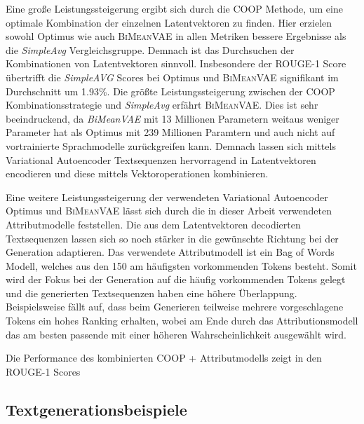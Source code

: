 Eine große Leistungssteigerung ergibt sich durch die COOP Methode, um eine optimale Kombination der einzelnen Latentvektoren zu finden.
Hier erzielen sowohl Optimus wie auch \textsc{BiMeanVAE} in allen Metriken bessere Ergebnisse als die \textit{SimpleAvg} Vergleichsgruppe.
Demnach ist das Durchsuchen der Kombinationen von Latentvektoren sinnvoll. 
Insbesondere der ROUGE-1 Score übertrifft die \textit{SimpleAVG} Scores bei Optimus und \textsc{BiMeanVAE} signifikant im Durchschnitt um 1.93\%.  %
Die größte Leistungssteigerung zwischen der COOP Kombinationsstrategie und \textit{SimpleAvg} erfährt \textsc{BiMeanVAE}.
Dies ist sehr beeindruckend, da \textit{BiMeanVAE} mit 13 Millionen Parametern weitaus weniger Parameter hat als Optimus mit 239 Millionen Paramtern und auch nicht auf vortrainierte Sprachmodelle zurückgreifen kann.
Demnach lassen sich mittels Variational Autoencoder Textsequenzen hervorragend in Latentvektoren encodieren und diese mittels Vektoroperationen kombinieren.

Eine weitere Leistungssteigerung der verwendeten Variational Autoencoder Optimus und \textsc{BiMeanVAE} lässt sich durch die in dieser Arbeit verwendeten Attributmodelle feststellen.
Die aus dem Latentvektoren decodierten Textsequenzen lassen sich so noch stärker in die gewünschte Richtung bei der Generation adaptieren. 
Das verwendete Attributmodell ist ein Bag of Words Modell, welches aus den 150 am häufigsten vorkommenden Tokens besteht. 
Somit wird der Fokus bei der Generation auf die häufig vorkommenden Tokens gelegt und die generierten Textsequenzen haben eine höhere Überlappung.
Beispielsweise fällt auf, dass beim Generieren teilweise mehrere vorgeschlagene Tokens ein hohes Ranking erhalten, wobei am Ende durch das Attributionsmodell das am besten passende mit einer höheren Wahrscheinlichkeit ausgewählt wird.

Die Performance des kombinierten COOP + Attributmodells zeigt in den ROUGE-1 Scores

\subsection{Textgenerationsbeispiele}


\scriptsize
\newlength{\DepthReference}

